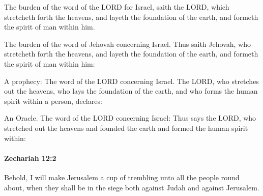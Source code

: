 			The burden of the word of the LORD for Israel, saith the LORD, which stretcheth forth the heavens, and layeth the foundation of the earth, and formeth the spirit of man within him.

			\begin{versebox}
					\item[BHS] 
					\item[LXX] 
					\item[ASV] The burden of the word of Jehovah concerning Israel. Thus saith Jehovah, who stretcheth forth the heavens, and layeth the foundation of the earth, and formeth the spirit of man within him:
					\item[NIV] A prophecy: The word of the LORD concerning Israel. The LORD, who stretches out the heavens, who lays the foundation of the earth, and who forms the human spirit within a person, declares:
					\item[NRSV] An Oracle. The word of the LORD concerning Israel: Thus says the LORD, who stretched out the heavens and founded the earth and formed the human spirit within:
			\end{versebox}

		\paragraph{Zechariah 12:2} %
			\label{ZECHARIAH-12-2}

			Behold, I will make Jerusalem a cup of trembling unto all the people round about, when they shall be in the siege both against Judah and against Jerusalem.

